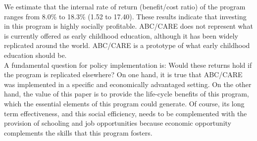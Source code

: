 \noindent We estimate that the internal rate of return (benefit/cost ratio) of the program ranges from 8.0\% to 18.3\% (1.52 to 17.40). These results indicate that investing in this program is highly socially profitable. ABC/CARE does not represent what is currently offered as early childhood education, although it has been widely replicated around the world. ABC/CARE is a prototype of what early childhood education should be.\\ 

\noindent A fundamental question for policy implementation is: Would these returns hold if the program is replicated elsewhere? On one hand, it is true that ABC/CARE was implemented in a specific and economically advantaged setting. On the other hand, the value of this paper is to provide the life-cycle benefits of this program, which the essential elements of this program could generate. Of course, its long term effectiveness, and this social efficiency, needs to be complemented with the provision of schooling and job opportunities because economic opportunity complements the skills that this program fosters.\\
\singlespace




 
